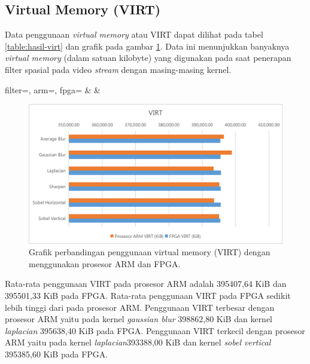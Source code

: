 \subsection{Virtual Memory (VIRT)}
Data penggunaan \textit{virtual memory} atau VIRT dapat dilihat pada tabel \ref{table:hasil-virt} dan grafik pada gambar \ref{fig:chart-virt}. Data ini menunjukkan banyaknya \textit{virtual memory} (dalam satuan kilobyte) yang digunakan pada saat penerapan filter spasial pada video \textit{stream} dengan masing-masing kernel.
\begin{atable}
    \caption{Tabel perbandingan penggunaan virtual memory (VIRT) dengan menggunakan prosesor ARM dan FPGA.}
    \label{table:hasil-virt}
        {
            filter=\filter, 
            arm=\arm, 
            fpga=\fpga}
        {
            \filter & 
            \arm & 
            \fpga }
\end{atable}
\begin{figure}[H]
    \includegraphics[width=0.81\linewidth, center]{images/chart/chart-virt.png}
    \caption{Grafik perbandingan penggunaan virtual memory (VIRT) dengan menggunakan prosesor ARM dan FPGA.}
    \label{fig:chart-virt}
\end{figure}
Rata-rata penggunaan VIRT pada prosesor ARM adalah 395407,64 KiB dan 395501,33 KiB pada FPGA. Rata-rata penggunaan VIRT pada FPGA sedikit lebih tinggi dari pada prosesor ARM. Penggunaan VIRT terbesar dengan prosesor ARM yaitu pada kernel \textit{gaussian blur} 398862,80 KiB dan kernel \textit{laplacian} 395638,40 KiB pada FPGA. Penggunaan VIRT terkecil dengan prosesor ARM yaitu pada kernel \textit{laplacian}393388,00 KiB dan kernel \textit{sobel vertical} 395385,60 KiB pada FPGA.
